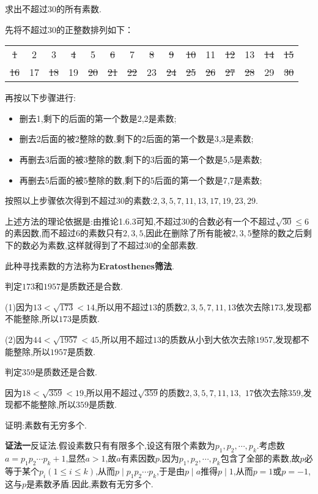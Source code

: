 \example 求出不超过$30$的所有素数.

\solve 先将不超过$30$的正整数排列如下：
\begin{center}
	\begin{tabular}{ccccccccccccccc}
		\sout{1}  & 2 & 3 & \sout{4} & 5 & \sout{6} & 7 & \sout{8} & \sout{9} & \sout{10} & 11 & \sout{12} & 13 & \sout{14} & \sout{15} \\
		\sout{16} & 17 & \sout{18} & 19 & \sout{20} & \sout{21} & \sout{22} & 23 & \sout{24} & \sout{25} & \sout{26} & \sout{27} & \sout{28} & 29 & \sout{30} \\
	\end{tabular}
\end{center}

再按以下步骤进行:
\begin{itemize}
	\item[\ding{172}] 删去1,剩下的后面的第一个数是2,2是素数;
	\item[\ding{173}] 删去2后面的被2整除的数,剩下的2后面的第一个数是3,3是素数;
	\item[\ding{174}] 再删去3后面的被3整除的数,剩下的3后面的第一个数是5,5是素数;
	\item[\ding{175}] 再删去5后面的被5整除的数,剩下的5后面的第一个数是7,7是素数;
\end{itemize}
按照以上步骤依次得到不超过30的素数:$2,3,5,7,11,13,17,19,23,29$.

\remark 上述方法的理论依据是:由推论1.6.3可知,不超过30的合数必有一个不超过$\sqrt{30} \leqslant 6$的素因数,而不超过6的素数只有$2,3,5$,因此在删除了所有能被$2,3,5$整除的数之后剩下的数必为素数,这样就得到了不超过30的全部素数.

此种寻找素数的方法称为\textbf{Eratosthenes筛法}.

\example 判定$173$和$1957$是质数还是合数.

\solve (1)因为$13<\sqrt{173}<14$,所以用不超过$13$的质数$2,3,5,7,11,13$依次去除$173$,发现都不能整除,所以$173$是质数.

(2)因为$44<\sqrt{1957}<45$,所以用不超过$13$的质数从小到大依次去除$1957$,发现都不能整除,所以$1957$是质数.

\example 判定$359$是质数还是合数.

\solve 因为$18<\sqrt{359}<19$,所以用不超过$\sqrt{359}$的质数$2,3,5,7,11,13,$ $17$依次去除$359$,发现都不能整除,所以$359$是质数.

\example 证明:素数有无穷多个.

\proof \textbf{证法一}反证法.假设素数只有有限多个,设这有限个素数为$p_{1}, p_{2}, \cdots, p_{k}$.考虑数$a=p_{1} p_{2} \cdots p_{k}+1$,显然$a>1$,故$a$有素因数$p$.因为$p_{1}, p_{2}, \cdots, p_{k}$包含了全部的素数,故$p$必等于某个$p_{i}(1 \leqslant i \leqslant k)$,从而$p \mid p_{1} p_{2} \cdots p_{k}$,于是由$p \mid a$推得$p \mid 1$,从而$p=1$或$p=-1$,这与$p$是素数矛盾.因此,素数有无穷多个.

